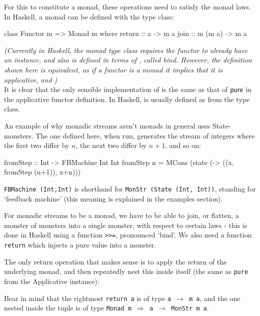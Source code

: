 For this to constitute a monad, these operations need to satisfy the monad laws. 
In Haskell, a monad can be defined with the  type class:

\begin{haskell}
class Functor m => Monad m where
  return :: a -> m a
  join :: m (m a) -> m a
\end{haskell}

\emph{(Currently in Haskell, the monad type class requires the functor to already have an  instance, and also is defined in terms of \hcode{(\ >>=\ )}, called bind. However, the definition shown here is equivalent, as if a functor is a monad it implies that it is applicative, and )}\\

It is clear that the only sensible implementation of  is the same as that of $\mathsf{pure}$ in the applicative functor definition. In Haskell,  is usually defined as  from the  type class.

An example of why monadic streams aren't monads in general uses State-monsters. The one defined here, when run, generates the stream of integers where the first two differ by $n$, the next two differ by $n+1$, and so on:
\begin{haskell}
fromStep :: Int -> FBMachine Int Int
fromStep n = MCons (state (\x -> ((x, fromStep (n+1)), x+n)))
\end{haskell}
\verb+FBMachine (Int,Int)+ is shorthand for \verb+MonStr (State (Int, Int))+, standing for `feedback machine' (this meaning is explained in the examples section).

For monadic streams to be a monad, we have to be able to join, or flatten, a monster of monsters into a single monster, with respect to certain laws - this is done in Haskell using a function \verb+>>=+, pronounced `bind'. We also need a function \verb+return+ which injects a pure value into a monster.

The only return operation that makes sense is to apply the return of the underlying monad, and then repeatedly nest this inside itself (the same as \verb+pure+ from the Applicative instance):
Bear in mind that the rightmost \verb+return a+ is of type \texttt{a $\to$ m a}, and the one nested inside the tuple is of type \texttt{Monad m $\Rightarrow$ a $\to$ MonStr m a}. \\

